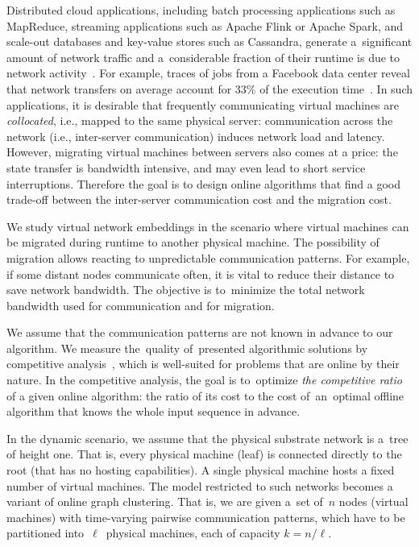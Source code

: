 \documentclass[manuscript,screen=true]{acmart}
\begin{document}
Distributed cloud applications, including batch processing
applications such as MapReduce, streaming applications such as Apache Flink or
Apache Spark, and scale-out databases and key-value stores such as Cassandra,
generate a~significant amount of network traffic and a~considerable fraction
of their runtime is due to network activity~\cite{MogPop12}. For example,
traces of jobs from a Facebook data center reveal that network transfers on
average account for 33\% of the execution time~\cite{orchestra}. In such
applications, it is desirable that frequently communicating virtual machines
are \emph{collocated}, i.e., mapped to the same physical server: 
communication across the network (i.e., inter-server communication) induces
network load and latency. However, migrating virtual machines between servers
also comes at a price: the state transfer is bandwidth intensive, and may even
lead to short service interruptions. Therefore the goal is to design online
algorithms that find a good trade-off between the inter-server communication
cost and the migration cost.


\vspace{1cm}

We study virtual network embeddings in the scenario where virtual machines can be migrated during runtime to another physical machine.
The possibility of migration allows reacting to unpredictable communication patterns.
For example, if some distant nodes communicate often, it is vital to reduce their distance to save network bandwidth.
The objective is to~minimize the total network bandwidth used for communication and for migration.


We assume that the communication patterns are not known in advance to our algorithm.
We measure the~quality of~presented algorithmic solutions by competitive analysis~\cite{borodin-book}, which is well-suited for problems that are online by their nature.
In the competitive analysis, the goal is to~optimize \emph{the competitive ratio} of a given online algorithm: the ratio of its cost to the cost of~an~optimal offline algorithm that knows the whole input sequence in advance.

In the dynamic scenario, we assume that the physical substrate network is a~tree of height one.
That is, every physical machine (leaf) is connected directly to the root (that has no hosting capabilities).
A single physical machine hosts a fixed number of virtual machines.
The model restricted to such networks becomes a variant of online graph clustering.
That is, we are given a~set of~$n$ nodes (virtual machines) with time-varying pairwise
communication patterns, which have to be partitioned into~$\ell$~physical machines, each of
capacity $k=n/\ell$.
\end{document}
